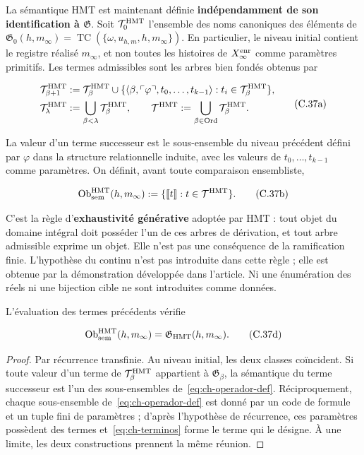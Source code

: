 La sémantique HMT est maintenant définie \textbf{indépendamment de son identification à \(\mathfrak G\)}. Soit \(\mathcal T_0^{\rm HMT}\) l'ensemble des noms canoniques des éléments de \(\mathfrak G_0(h,m_\infty)=
\operatorname{TC}(\{\omega,u_{h,m},h,m_\infty\})\). En particulier, le niveau initial contient le registre réalisé \(m_\infty\), et non toutes les histoires de \(X_\infty^{\rm enr}\) comme paramètres primitifs. Les termes admissibles sont les arbres bien fondés obtenus par

\[
 \begin{aligned}
 \mathcal T^{\rm HMT}_{\beta+1}
 &:={\mathcal T}^{\rm HMT}_\beta\cup
 \{\langle\beta,\ulcorner\varphi\urcorner,
       t_0,\ldots,t_{k-1}\rangle:
       t_i\in\mathcal T^{\rm HMT}_\beta\},\\
 \mathcal T^{\rm HMT}_\lambda&:=
       \bigcup_{\beta<\lambda}\mathcal T^{\rm HMT}_\beta,
 \qquad
 \mathcal T^{\rm HMT}:=
       \bigcup_{\beta\in\operatorname{Ord}}\mathcal T^{\rm HMT}_\beta.
 \end{aligned}
\tag{C.37a}\label{eq:ch-terminos}
\]

La valeur d’un terme successeur est le sous-ensemble du niveau précédent défini
par \(\varphi\) dans la structure relationnelle induite, avec les valeurs de
\(t_0,\ldots,t_{k-1}\) comme paramètres. On définit, avant toute
comparaison ensembliste,

\[
 \operatorname{Ob}_{\rm sem}^{\rm HMT}(h,m_\infty)
 :=\{\llbracket t\rrbracket:t\in\mathcal T^{\rm HMT}\}.
\tag{C.37b}\label{eq:ch-objetos-semanticos}
\]

C'est la règle d'\textbf{exhaustivité générative} adoptée par HMT : tout objet du domaine intégral doit posséder l'un de ces arbres de dérivation, et tout arbre admissible exprime un objet. Elle n'est pas une conséquence de la ramification finie. L'hypothèse du continu n'est pas introduite dans cette règle ; elle est obtenue par la démonstration développée dans l'article. Ni une énumération des réels ni une bijection cible ne sont introduites comme données.

\begin{theorem}
\label{thm:ch-6a}
L’évaluation des
termes précédents vérifie

\[
 \operatorname{Ob}_{\rm sem}^{\rm HMT}(h,m_\infty)
 =\mathfrak G_{\rm HMT}(h,m_\infty).
\tag{C.37d}\label{eq:ch-equivalencia-semantica}
\]

\end{theorem}
\begin{proof}
Par récurrence transfinie. Au niveau initial, les deux classes coïncident. Si toute valeur d'un terme de \(\mathcal T^{\rm HMT}_\beta\) appartient à \(\mathfrak G_\beta\), la sémantique du terme successeur est l'un des sous-ensembles de~\eqref{eq:ch-operador-def}. Réciproquement, chaque sous-ensemble de~\eqref{eq:ch-operador-def} est donné par un code de formule et un tuple fini de paramètres ; d'après l'hypothèse de récurrence, ces paramètres possèdent des termes et~\eqref{eq:ch-terminos} forme le terme qui le désigne. À une limite, les deux constructions prennent la même réunion.
\end{proof}

